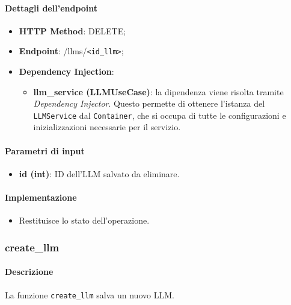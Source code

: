 \paragraph{Dettagli dell'endpoint}
\begin{itemize}
    \item \textbf{HTTP Method}: DELETE;
    \item \textbf{Endpoint}: /llms/\texttt{<id\_llm>};
    \item \textbf{Dependency Injection}:
    \begin{itemize}
        \item \textbf{llm\_service (LLMUseCase)}: la dipendenza viene risolta tramite \textit{Dependency Injector}. Questo permette di ottenere l'istanza del \texttt{LLMService} dal \texttt{Container}, che si occupa di tutte le configurazioni e inizializzazioni necessarie per il servizio.
    \end{itemize}
\end{itemize}

\paragraph{Parametri di input}
\begin{itemize}
    \item \textbf{id (int)}: ID dell'LLM salvato da eliminare.
\end{itemize}

\paragraph{Implementazione}
\begin{itemize}
    \item Restituisce lo stato dell'operazione.
\end{itemize}

\subsubsection{create\_llm}
\label{sec:create_llm}

\paragraph{Descrizione}
La funzione \texttt{create\_llm} salva un nuovo LLM.

